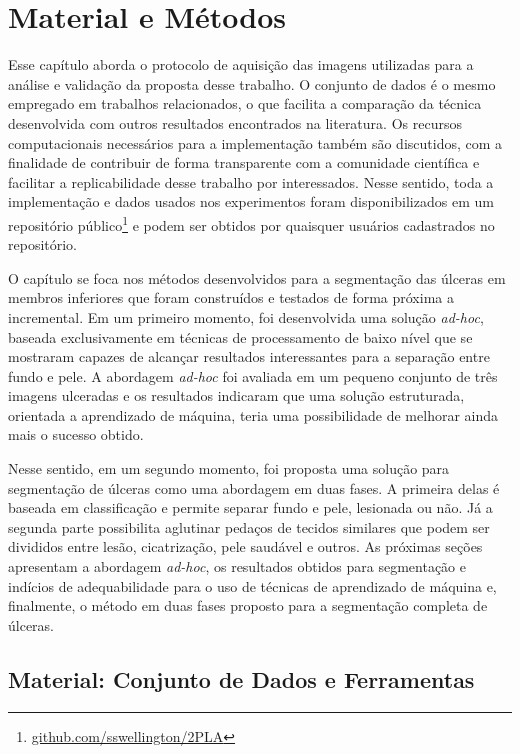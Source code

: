 \clearpage
\section{Material e Métodos}\label{sec:methods}

Esse capítulo aborda o protocolo de aquisição das imagens utilizadas para a análise e validação da proposta desse trabalho.
O conjunto de dados é o mesmo empregado em trabalhos relacionados, o que facilita a comparação da técnica desenvolvida com outros resultados encontrados na literatura.
Os recursos computacionais necessários para a implementação também são discutidos, com a finalidade de contribuir de forma transparente com a comunidade científica e facilitar a replicabilidade desse trabalho por interessados.
Nesse sentido, toda a implementação e dados usados nos experimentos foram disponibilizados em um repositório público\footnote{\url{github.com/sswellington/2PLA}} e podem ser obtidos por quaisquer usuários cadastrados no repositório.

O capítulo se foca nos métodos desenvolvidos para a segmentação das úlceras em membros inferiores que foram construídos e testados de forma próxima a incremental.
Em um primeiro momento, foi desenvolvida uma solução \textit{ad-hoc}, baseada exclusivamente em técnicas de processamento de baixo nível que se mostraram capazes de alcançar resultados interessantes para a separação entre fundo e pele.
A abordagem \textit{ad-hoc} foi avaliada em um pequeno conjunto de três imagens ulceradas e os resultados indicaram que uma solução estruturada, orientada a aprendizado de máquina, teria uma possibilidade de melhorar ainda mais o sucesso obtido.

Nesse sentido, em um segundo momento, foi proposta uma solução para segmentação de úlceras como uma abordagem em duas fases.
A primeira delas é baseada em classificação e permite separar fundo e pele, lesionada ou não.
Já a segunda parte possibilita aglutinar pedaços de tecidos similares que podem ser divididos entre lesão, cicatrização, pele saudável e outros.
As próximas seções apresentam a abordagem \textit{ad-hoc}, os resultados obtidos para segmentação e indícios de adequabilidade para o uso de técnicas de aprendizado de máquina e, finalmente, o método em duas fases proposto para a segmentação completa de úlceras.


\subsection{Material: Conjunto de Dados e Ferramentas}

